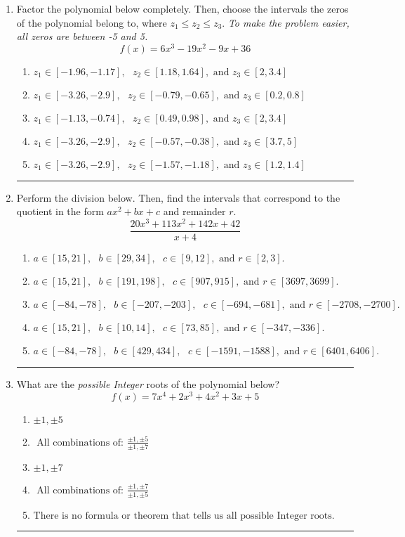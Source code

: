 \documentclass[14pt]{extbook}
\newcommand{\litem}[1]{\item#1\hspace*{-1cm}\rule{\textwidth}{0.4pt}}
\begin{document}
\begin{enumerate}
{\begin{enumerate}[label=\Alph*.]
\end{enumerate} }
\litem{
Factor the polynomial below completely. Then, choose the intervals the zeros of the polynomial belong to, where $z_1 \leq z_2 \leq z_3$. \textit{To make the problem easier, all zeros are between -5 and 5.}\[ f(x) = 6x^{3} -19 x^{2} -9 x + 36 \]\begin{enumerate}[label=\Alph*.]
\item \( z_1 \in [-1.96, -1.17], \text{   }  z_2 \in [1.18, 1.64], \text{   and   } z_3 \in [2, 3.4] \)
\item \( z_1 \in [-3.26, -2.9], \text{   }  z_2 \in [-0.79, -0.65], \text{   and   } z_3 \in [0.2, 0.8] \)
\item \( z_1 \in [-1.13, -0.74], \text{   }  z_2 \in [0.49, 0.98], \text{   and   } z_3 \in [2, 3.4] \)
\item \( z_1 \in [-3.26, -2.9], \text{   }  z_2 \in [-0.57, -0.38], \text{   and   } z_3 \in [3.7, 5] \)
\item \( z_1 \in [-3.26, -2.9], \text{   }  z_2 \in [-1.57, -1.18], \text{   and   } z_3 \in [1.2, 1.4] \)

\end{enumerate} }
\litem{
Perform the division below. Then, find the intervals that correspond to the quotient in the form $ax^2+bx+c$ and remainder $r$.\[ \frac{20x^{3} +113 x^{2} +142 x + 42}{x + 4} \]\begin{enumerate}[label=\Alph*.]
\item \( a \in [15, 21], \text{   } b \in [29, 34], \text{   } c \in [9, 12], \text{   and   } r \in [2, 3]. \)
\item \( a \in [15, 21], \text{   } b \in [191, 198], \text{   } c \in [907, 915], \text{   and   } r \in [3697, 3699]. \)
\item \( a \in [-84, -78], \text{   } b \in [-207, -203], \text{   } c \in [-694, -681], \text{   and   } r \in [-2708, -2700]. \)
\item \( a \in [15, 21], \text{   } b \in [10, 14], \text{   } c \in [73, 85], \text{   and   } r \in [-347, -336]. \)
\item \( a \in [-84, -78], \text{   } b \in [429, 434], \text{   } c \in [-1591, -1588], \text{   and   } r \in [6401, 6406]. \)

\end{enumerate} }
\litem{
What are the \textit{possible Integer} roots of the polynomial below?\[ f(x) = 7x^{4} +2 x^{3} +4 x^{2} +3 x + 5 \]\begin{enumerate}[label=\Alph*.]
\item \( \pm 1,\pm 5 \)
\item \( \text{ All combinations of: }\frac{\pm 1,\pm 5}{\pm 1,\pm 7} \)
\item \( \pm 1,\pm 7 \)
\item \( \text{ All combinations of: }\frac{\pm 1,\pm 7}{\pm 1,\pm 5} \)
\item \( \text{There is no formula or theorem that tells us all possible Integer roots.} \)


\end{enumerate}}
\end{enumerate}
\end{document}
